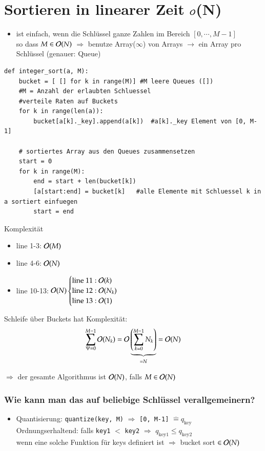 \section{Sortieren in linearer Zeit $\mathcal{O}{}$(N)}
\begin{itemize}
    \item ist einfach, wenn die Schlüssel ganze Zahlen im Bereich $[0, \cdots, M-1]$ \\
    so dass $M \in \mathcal{O}{}(N)$ $\Rightarrow$ benutze Array($\infty$) von Arrays $\rightarrow$ ein Array pro Schlüssel (genauer: Queue)
\end{itemize}
\begin{verbatim}
def integer_sort(a, M):
    bucket = [ [] for k in range(M)] #M leere Queues ([])
    #M = Anzahl der erlaubten Schluessel
    #verteile Raten auf Buckets
    for k in range(len(a)):
        bucket[a[k]._key].append(a[k])  #a[k]._key Element von [0, M-1]

    # sortiertes Array aus den Queues zusammensetzen
    start = 0
    for k in range(M):
        end = start + len(bucket[k])
        [a[start:end] = bucket[k]   #alle Elemente mit Schluessel k in a sortiert einfuegen
        start = end
\end{verbatim}
Komplexität
\begin{itemize}
    \item line 1-3: $\mathcal{O}{}(M)$
    \item line 4-6: $\mathcal{O}{}(N)$
    \item line 10-13: $\mathcal{O}{}(N) \begin{cases} \text{line 11}: \mathcal{O}{}(k) \\ \text{line 12}: \mathcal{O}{}(N_k) \\ \text{line 13}: \mathcal{O}{}(1) \end{cases}$
\end{itemize}
Schleife über Buckets hat Komplexität: \[\sum_{\Psi = 0}^{M-1} \mathcal{O}{}(N_k) = \mathcal{O}{}\underbrace{\left(\sum_{k = 0}^{M-1}N_k\right)}_{=N} = \mathcal{O}{}(N)\]

$\Rightarrow$ der gesamte Algorithmus ist $\mathcal{O}{}(N)$, falls $M \in \mathcal{O}{}(N)$ \\

\subsubsection*{Wie kann man das auf beliebige Schlüssel verallgemeinern?}
\begin{itemize}
\item Quantisierung: \verb|quantize(key, M)| $\Rightarrow$ \verb|[0, M-1]| $\widehat{=} q_{\text{key}}$ \\
\hspace*{0.1cm} Ordnungserhaltend: falls \verb|key1| $<$ \verb|key2| $\Rightarrow$ $q_{\text{key1}} \leq q_{\text{key2}}$ \\
wenn eine solche Funktion für keys definiert ist $\Rightarrow$ bucket sort $\in \mathcal{O}{}(N)$
\end{itemize}

